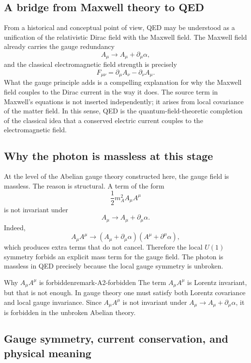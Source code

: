 \documentclass[11pt,a4paper]{article}
\newcommand{\p}{\partial}
\begin{document}
\subsection{A bridge from Maxwell theory to QED}

From a historical and conceptual point of view, QED may be understood as a unification of the relativistic Dirac field with the Maxwell field. The Maxwell field already carries the gauge redundancy
\[
A_\mu\to A_\mu+\p_\mu\alpha,
\]
and the classical electromagnetic field strength is precisely
\[
F_{\mu\nu}=\p_\mu A_\nu-\p_\nu A_\mu.
\]
What the gauge principle adds is a compelling explanation for why the Maxwell field couples to the Dirac current in the way it does. The source term in Maxwell's equations is not inserted independently; it arises from local covariance of the matter field. In this sense, QED is the quantum-field-theoretic completion of the classical idea that a conserved electric current couples to the electromagnetic field.



\subsection{Why the photon is massless at this stage}

At the level of the Abelian gauge theory constructed here, the gauge field is massless. The reason is structural. A term of the form
\begin{equation}
\frac12 m_A^2 A_\mu A^\mu
\label{eq:mass-term-abelian}
\end{equation}
is not invariant under
\[
A_\mu\to A_\mu+\p_\mu\alpha.
\]
Indeed,
\[
A_\mu A^\mu \to (A_\mu+\p_\mu\alpha)(A^\mu+\p^\mu\alpha),
\]
which produces extra terms that do not cancel. Therefore the local \(U(1)\) symmetry forbids an explicit mass term for the gauge field. The photon is massless in QED precisely because the local gauge symmetry is unbroken.

\begin{remarkbox}{Why \texorpdfstring{$A_\mu A^\mu$}{AμAμ} is forbidden}{remark-A2-forbidden}
The term \(A_\mu A^\mu\) is Lorentz invariant, but that is not enough. In gauge theory one must satisfy both Lorentz covariance and local gauge invariance. Since \(A_\mu A^\mu\) is not invariant under \(A_\mu\to A_\mu+\p_\mu\alpha\), it is forbidden in the unbroken Abelian theory.
\end{remarkbox}



\subsection{Gauge symmetry, current conservation, and physical meaning}
\end{document}
